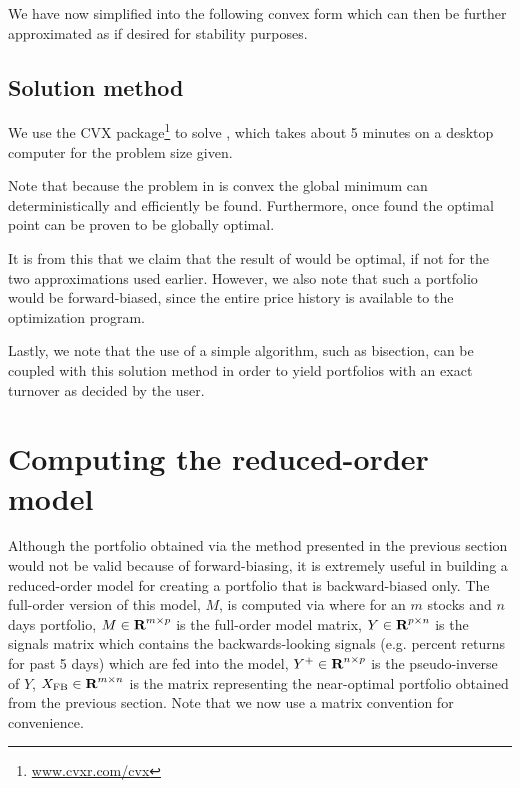 \documentclass{article}
\begin{document}
    We have now simplified  into the following convex form
        which can then be further approximated as 
        if desired for stability purposes.

\subsection{Solution method}
    We use the CVX package\footnote{\url{www.cvxr.com/cvx}} to solve 
        , which takes about 5 minutes on a desktop computer
        for the problem size given.

    Note that because the problem in  is convex
        the global minimum can deterministically and efficiently be found.
    Furthermore, once found the optimal point can be proven to be globally
        optimal.

    It is from this that we claim that the result of 
        would be optimal, if not for the two approximations used earlier.
    However, we also note that such a portfolio would be forward-biased,
        since the entire price history is available 
        to the optimization program.

    Lastly, we note that the use of a simple algorithm, such as bisection,
        can be coupled with this solution method
        in order to yield portfolios with an exact turnover 
        as decided by the user.

\section{Computing the reduced-order model}   

    Although the portfolio obtained 
        via the method presented in the previous section
        would not be valid because of forward-biasing,
        it is extremely useful in building a reduced-order model
        for creating a portfolio that is backward-biased only.
    The full-order version of this model, $M$, is computed via
    where for an $m$ stocks and $n$ days portfolio,
        \BI $M \in {\mbox{\bf R}}^{m \times p}$ is the full-order model matrix,
        \I  $Y \in {\mbox{\bf R}}^{p \times n}$ is the signals matrix 
            which contains the backwards-looking signals 
            (e.g. percent returns for past 5 days)
            which are fed into the model,
        \I  $Y^+ \in {\mbox{\bf R}}^{n \times p}$ is the pseudo-inverse of $Y$,
        \I  $X_\text{FB} \in {\mbox{\bf R}}^{m \times n}$ is the matrix representing 
            the near-optimal portfolio obtained from the previous section.
            Note that we now use a matrix convention for convenience. \EI
\end{document}
